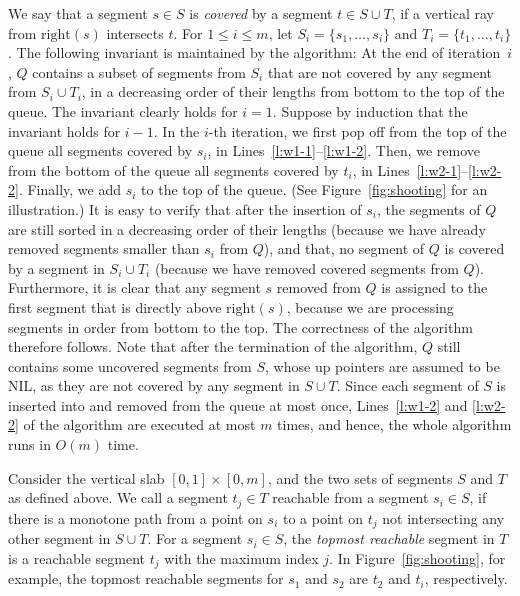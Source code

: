 \documentclass[12pt]{dalthesis}
\def\favoritefont{\bfseries \sffamily}
\def\QED{\ensuremath{{\Box}}}
\def\markatright#1{\leavevmode\unskip\nobreak\quad\hspace*{\fill}{#1}}
\newenvironment{proof}
	{\begin{trivlist}\item[\hskip\labelsep{\favoritefont Proof:}]}
	{\markatright{\QED}\end{trivlist}}
\newcommand{\qed}{}
\newcommand{\lee}{\leqslant}
\newcommand{\set}[1]{{\{ #1 \}}}
\newcommand{\Right}{\mbox{right}}
\begin{document}
\begin{proof}
	We say that a segment $s \in S$
	is \emph{covered} by a segment $t \in S \cup T$,
	if a vertical ray from $\Right(s)$ intersects $t$.	
	For  $1 \lee i \lee m$,
	let $S_i = \set{s_1, \ldots, s_i}$ and $T_i = \set{t_1, \ldots, t_i}$.
	The following invariant is maintained by the algorithm:
	At the end of iteration~$i$, 
	$Q$ contains a subset of segments from $S_i$
	that are not covered by any segment from $S_i \cup T_i$,
	in a decreasing order of their lengths from bottom to the top of the queue.
	The invariant clearly holds for $i=1$.
	Suppose by induction that the invariant holds for $i-1$.
	In the $i$-th iteration,
	we first pop off from the top of the queue all segments
	covered by $s_i$, in Lines~\ref{l:w1-1}--\ref{l:w1-2}.
	Then, we remove from the bottom of the queue all
	segments covered by $t_i$, in Lines~\ref{l:w2-1}--\ref{l:w2-2}.
	Finally, we add $s_i$ to the top of the queue.
	(See Figure~\ref{fig:shooting} for an illustration.)
	It is easy to verify that after the insertion of $s_i$,
	the segments of $Q$ are still sorted in a decreasing order of their lengths
	(because we have already removed segments smaller than $s_i$ from $Q$),
	and that, no segment of $Q$ is covered by a segment in $S_i \cup T_i$
	(because we have removed covered segments from $Q$).
	Furthermore, it is clear that any segment $s$ removed from $Q$
	is assigned to the first segment that is directly above $\Right(s)$,
	because we are processing segments in order from bottom to the top.
	The correctness of the algorithm therefore follows.
	Note that after the termination of the algorithm,
	$Q$ still contains some uncovered segments from $S$, whose
	up pointers are assumed to be NIL, 
	as they are not covered by any segment in $S \cup T$.
	Since each segment of $S$ is inserted into and removed from the queue at most once,
	Lines~\ref{l:w1-2} and \ref{l:w2-2} of the algorithm are executed at most $m$ times,
	and hence, the whole algorithm runs in $O(m)$ time.
	\qed
\end{proof}

Consider the vertical slab $[0,1] \times [0,m]$, 
and the two sets of segments $S$ and $T$ as defined above. 
We call a segment $t_j \in T$ {reachable} from a segment $s_i \in S$,
if there is a monotone path from a point on $s_i$ to a point on $t_j$ 
not intersecting any other segment in $S \cup T$.
For a segment $s_i \in S$, the \emph{topmost reachable} segment in $T$ is 
a reachable segment $t_j$ with the maximum index $j$. 
In Figure~\ref{fig:shooting}, for example, 
the topmost reachable segments for $s_1$ and $s_2$
are $t_2$ and $t_i$, respectively.
\end{document}
